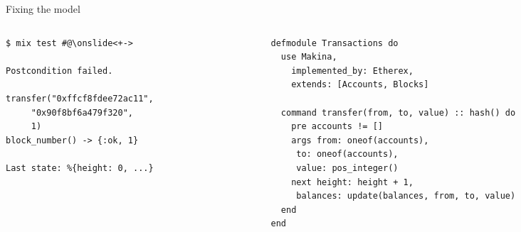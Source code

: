 \documentclass[aspectratio=169, 10pt, handout]{beamer}
\begin{document}
\begin{frame}[label={sec:org3494fc7},fragile]{Fixing the model}
 \begin{columns}
\begin{column}{0.44\columnwidth}
\lstset{language=bash,label= ,caption= ,captionpos=b,numbers=none,style=shell}
\begin{lstlisting}
$ mix test #@\onslide<+->

Postcondition failed.

transfer("0xffcf8fdee72ac11",
	 "0x90f8bf6a479f320",
	 1)
block_number() -> {:ok, 1}

Last state: %{height: 0, ...}
\end{lstlisting}
\end{column}

\begin{column}{0.52\columnwidth}
\onslide<+->
\lstset{language=elixir,label= ,caption= ,captionpos=b,numbers=none,style=display}
\begin{lstlisting}
defmodule Transactions do
  use Makina,
    implemented_by: Etherex,
    extends: [Accounts, Blocks]

  command transfer(from, to, value) :: hash() do
    pre accounts != []
    args from: oneof(accounts),
	 to: oneof(accounts),
	 value: pos_integer()
    next height: height + 1,
	 balances: update(balances, from, to, value)
  end
end
\end{lstlisting}
\end{column}
\end{columns}
\end{frame}
\end{document}
